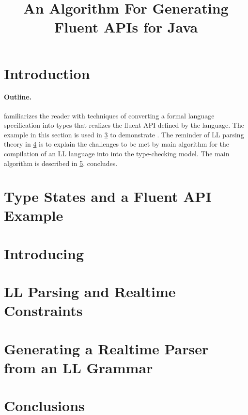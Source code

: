 \documentclass[nonatbib,preprint,numbers]{sigplanconf}
\title
{%
An Algorithm For Generating Fluent APIs for  Java 
}
\begin{document}
\maketitle

\begin{abstract}

\end{abstract}

\section{Introduction}


\paragraph{Outline.}  familiarizes the reader with
techniques of converting a formal language specification into \Java types that
realizes the fluent API defined by the language. The example in this section is
used in \cref{section:fajita} to demonstrate \Fajita.  The reminder of LL
parsing theory in \cref{section:intuition} is to explain the challenges to be
met by main algorithm for the compilation of an LL language into into the \Java
type-checking model.  The main algorithm is described in
\cref{section:algorithm}.   concludes.

\section{Type States and a Fluent API Example}
\label{section:example}


\section{Introducing \Fajita}
\label{section:fajita}


\section{LL Parsing and Realtime Constraints}
\label{section:intuition}


\section{Generating a Realtime Parser \\ from an LL Grammar}
\label{section:algorithm}


\section{Conclusions}
\label{section:zz}


\small

\end{document}
